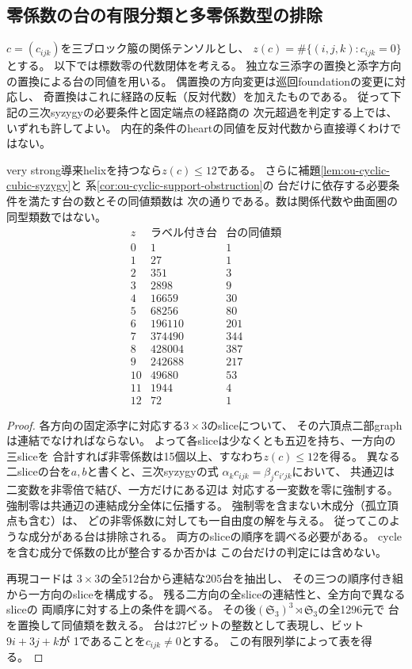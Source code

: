 \subsection{零係数の台の有限分類と多零係数型の排除}
\label{subsec:ou-zero-supports}

$c=(c_{ijk})$を三ブロック箙の関係テンソルとし、
$z(c)=\#\{(i,j,k):c_{ijk}=0\}$とする。
以下では標数零の代数閉体を考える。
独立な三添字の置換と添字方向の置換による台の同値を用いる。
偶置換の方向変更は巡回foundationの変更に対応し、
奇置換はこれに経路の反転（反対代数）を加えたものである。
従って下記の三次syzygyの必要条件と固定端点の経路商の
次元超過を判定する上では、いずれも許してよい。
内在的条件のheartの同値を反対代数から直接導くわけではない。

\begin{proposition}[台の必要条件の有限列挙]
\label{prop:ou-zero-support-enumeration}
very strong導来helixを持つなら$z(c)\leq12$である。
さらに補題\ref{lem:ou-cyclic-cubic-syzygy}と
系\ref{cor:ou-cyclic-support-obstruction}の
台だけに依存する必要条件を満たす台の数とその同値類数は
次の通りである。数は関係代数や曲面圏の同型類数ではない。
\[
\begin{array}{r|r|r}
 z & \text{ラベル付き台} & \text{台の同値類}\\ \hline
0&1&1\\
1&27&1\\
2&351&3\\
3&2898&9\\
4&16659&30\\
5&68256&80\\
6&196110&201\\
7&374490&344\\
8&428004&387\\
9&242688&217\\
10&49680&53\\
11&1944&4\\
12&72&1
\end{array}
\]
\end{proposition}
\begin{proof}
各方向の固定添字に対応する$3\times3$のsliceについて、
その六頂点二部graphは連結でなければならない。
よって各sliceは少なくとも五辺を持ち、一方向の三sliceを
合計すれば非零係数は15個以上、すなわち$z(c)\leq12$を得る。
異なる二sliceの台を$a,b$と書くと、三次syzygyの式
$\alpha_k c_{ijk}=\beta_j c_{i'jk}$において、
共通辺は二変数を非零倍で結び、一方だけにある辺は
対応する一変数を零に強制する。
強制零は共通辺の連結成分全体に伝播する。
強制零を含まない木成分（孤立頂点も含む）は、
どの非零係数に対しても一自由度の解を与える。
従ってこのような成分がある台は排除される。
両方のsliceの順序を調べる必要がある。
cycleを含む成分で係数の比が整合するか否かは
この台だけの判定には含めない。

再現コードは
$3\times3$の全512台から連結な205台を抽出し、
その三つの順序付き組から一方向のsliceを構成する。
残る二方向の全sliceの連結性と、全方向で異なるsliceの
両順序に対する上の条件を調べる。
その後$(\mathfrak S_3)^3\rtimes\mathfrak S_3$の全1296元で
台を置換して同値類を数える。
台は27ビットの整数として表現し、ビット$9i+3j+k$が
1であることを$c_{ijk}\ne0$とする。
この有限列挙によって表を得る。
\end{proof}

